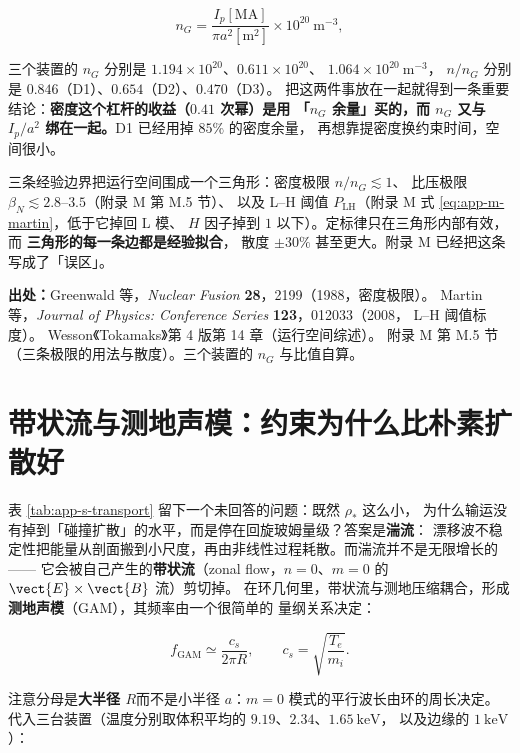 \begin{equation}
n_G=\frac{I_p[\mathrm{MA}]}{\pi a^2[\mathrm{m^2}]}\times10^{20}\ \mathrm{m^{-3}},
\label{eq:app-s-ng}
\end{equation}

三个装置的 $n_G$ 分别是 $1.194\times10^{20}$、$0.611\times10^{20}$、
$1.064\times10^{20}\ \mathrm{m^{-3}}$，
$n/n_G$ 分别是 $0.846$（D1）、$0.654$（D2）、$0.470$（D3）。
把这两件事放在一起就得到一条重要结论：\textbf{密度这个杠杆的收益（$0.41$ 次幂）是用
「$n_G$ 余量」买的，而 $n_G$ 又与 $I_p/a^2$ 绑在一起。}D1 已经用掉 $85\%$ 的密度余量，
再想靠提密度换约束时间，空间很小。

三条经验边界把运行空间围成一个三角形：密度极限 $n/n_G\lesssim1$、
比压极限 $\beta_N\lesssim2.8$--$3.5$（附录 M 第 M.5 节）、
以及 L--H 阈值 $P_{\mathrm{LH}}$（附录 M 式 \eqref{eq:app-m-martin}，低于它掉回 L 模、
$H$ 因子掉到 $1$ 以下）。定标律只在三角形内部有效，而 \textbf{三角形的每一条边都是经验拟合}，
散度 $\pm30\%$ 甚至更大。附录 M 已经把这条写成了「误区」。

{\footnotesize
\textbf{出处：}Greenwald 等，\textit{Nuclear Fusion} \textbf{28}，2199（1988，密度极限）。
Martin 等，\textit{Journal of Physics: Conference Series} \textbf{123}，012033（2008，
L--H 阈值标度）。
Wesson《Tokamaks》第 4 版第 14 章（运行空间综述）。
附录 M 第 M.5 节（三条极限的用法与散度）。三个装置的 $n_G$ 与比值自算。
}


\section{带状流与测地声模：约束为什么比朴素扩散好}
\label{sec:app-s-zonal}

表 \ref{tab:app-s-transport} 留下一个未回答的问题：既然 $\rho_\ast$ 这么小，
为什么输运没有掉到「碰撞扩散」的水平，而是停在回旋玻姆量级？答案是\textbf{湍流}：
漂移波不稳定性把能量从剖面搬到小尺度，再由非线性过程耗散。而湍流并不是无限增长的——
它会被自己产生的\textbf{带状流}（zonal flow，$n=0$、$m=0$ 的 $\vect{E}\times\vect{B}$ 流）剪切掉。
在环几何里，带状流与测地压缩耦合，形成\textbf{测地声模}（GAM），其频率由一个很简单的
量纲关系决定：

\begin{equation}
f_{\mathrm{GAM}}\simeq\frac{c_s}{2\pi R},
\qquad
c_s=\sqrt{\frac{T_e}{m_i}} .
\label{eq:app-s-gam}
\end{equation}

注意分母是\textbf{大半径 $R$}而不是小半径 $a$：$m=0$ 模式的平行波长由环的周长决定。
代入三台装置（温度分别取体积平均的 $9.19$、$2.34$、$1.65\ \mathrm{keV}$，
以及边缘的 $1\ \mathrm{keV}$）：

